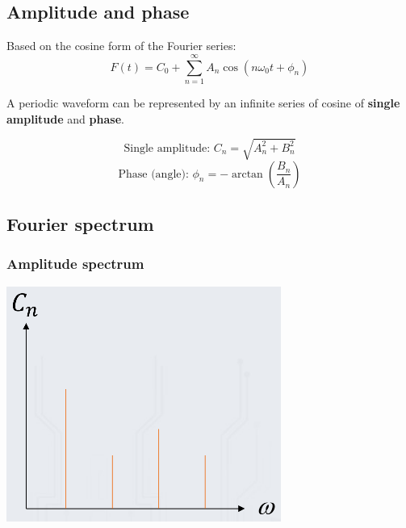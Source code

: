 \documentclass[11pt]{article}
\begin{document}
 \newpage
\subsection{Amplitude and phase}
\label{sec:orgfc79e78}
Based on the cosine form of the Fourier series:
\[F(t) = C_0 + \sum_{n = 1}^{\infty} A_n \cos (n \omega_0 t + \phi_n)\]

A periodic waveform can be represented by an infinite series of cosine of \textbf{single amplitude} and \textbf{phase}.

\[\text{Single amplitude: } C_n = \sqrt{A_n^2 +B_n^2}\]
\[\text{Phase (angle): } \phi_n = - \arctan \left(\frac{B_n}{A_n} \right)\]
\subsection{Fourier spectrum}
\label{sec:org1a2fba4}

\subsubsection{Amplitude spectrum}
\label{sec:org930fc56}
\begin{center}
\includegraphics[width=.9\linewidth]{./images/amplitude-spectrum.png}
\end{center}
\end{document}
